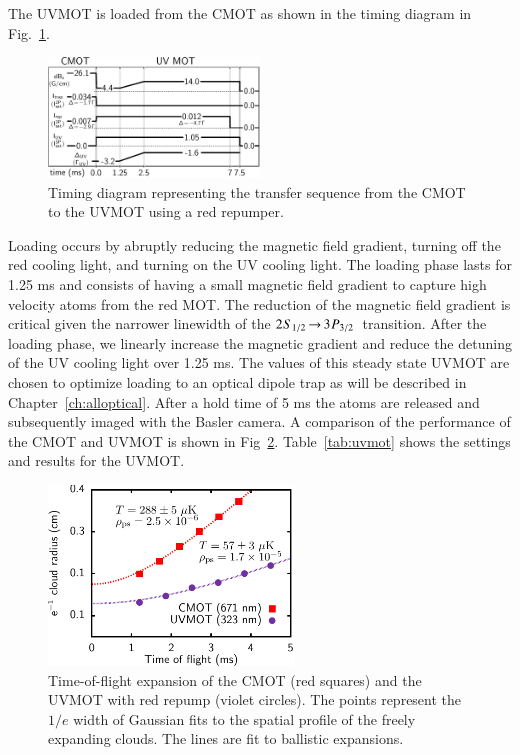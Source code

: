 \documentclass[oneside,12pt]{memoir}
\newcommand{\twos}[1]{\ensuremath{\hspace{-1pt}2\hspace{0.5pt}\hspace{0pt}S_{#1}\hspace{-1pt}}}
\newcommand{\trep}[1]{\ensuremath{\hspace{-1pt}3\hspace{0.5pt}\hspace{0pt}P_{#1}\hspace{-1pt}}}
\newcommand{\uv}{\ensuremath{ \twos{1/2}\hspace{-0.0pt}\rightarrow\hspace{-0.0pt}\trep{3/2} }\ }
\begin{document}
The UVMOT 
 is loaded from the CMOT as shown in the timing diagram in Fig.~\ref{fig:timing}.
\begin{figure} \centering
\includegraphics[width=0.5\textwidth]{../figures/323mot/timingdiagram-00/timing.pdf}
\caption[UVMOT loading timing diagram]{\small Timing diagram representing the
transfer sequence from the CMOT to the UVMOT using a red repumper. } \label{fig:timing} \end{figure}
Loading occurs by abruptly reducing the magnetic field gradient, turning off
the red cooling light, and turning on the UV cooling light.  The loading phase
lasts for 1.25 ms and consists of having a small magnetic field gradient to
capture high velocity atoms from the red MOT.   The reduction of the magnetic
field gradient is critical given the narrower linewidth of the \uv transition.
After the  loading phase, we linearly increase the magnetic gradient and reduce
the detuning of the UV cooling light over 1.25 ms.  The values of this steady
state UVMOT are chosen to optimize loading to an optical dipole trap as will be
described in Chapter~\ref{ch:alloptical}.  After a hold time of 5 ms the atoms
are released and subsequently imaged with the Basler camera. A comparison of
the performance of the CMOT and UVMOT is shown in
Fig~\ref{fig:uvtexp}.  Table~\ref{tab:uvmot} shows the settings and results for the UVMOT.
\begin{figure} \hspace{0.16\textwidth}
\includegraphics[width=0.58\textwidth]{../figures/323mot/tofexpansion-00/tofeps.pdf}
\caption[CMOT and UVMOT with red repump time-of-flight expansion]{\small Time-of-flight
expansion of the CMOT (red squares) and the UVMOT with red repump (violet circles).   The
points represent the $1/e$ width of Gaussian fits to the spatial profile of the
freely expanding clouds.  The lines are fit to ballistic expansions. }
\label{fig:uvtexp} \end{figure} 
\end{document}
